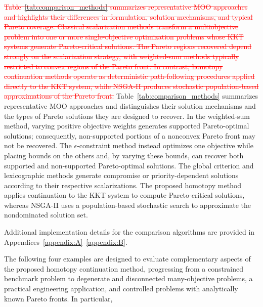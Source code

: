 \documentclass[11pt,pdflatex,sn-mathphys-ay]{sn-jnl}%
\theoremstyle{definition}
\theoremstyle{thmstyleone}%
\theoremstyle{thmstyletwo}%
\theoremstyle{thmstylethree}%
\newcommand{\del}[1]{\textcolor{red}{\sout{#1}}}
\newcommand{\add}[1]{\textcolor{revisionblue}{#1}}
\begin{document}
	\del{Table~\ref{tab:comparison_methods} summarizes representative MOO approaches and highlights their differences in formulation, solution mechanisms, and typical Pareto coverage. Classical scalarization methods transform a multiobjective problem into one or more single-objective optimization problems whose KKT systems generate Pareto-critical solutions. The Pareto regions recovered depend strongly on the scalarization strategy, with weighted-sum methods typically restricted to convex regions of the Pareto front. In contrast, homotopy continuation methods operate as deterministic path-following procedures applied directly to the KKT system, while NSGA-II produces stochastic population-based approximations of the Pareto front.}
	\add{Table~\ref{tab:comparison_methods} summarizes representative MOO
		approaches and distinguishes their solution mechanisms and the types of
		Pareto solutions they are designed to recover. In the weighted-sum
		method, varying positive objective weights generates supported
		Pareto-optimal solutions; consequently, non-supported portions of a
		nonconvex Pareto front may not be recovered. The
		$\epsilon$-constraint method instead optimizes one objective while
		placing bounds on the others and, by varying these bounds, can recover
		both supported and non-supported Pareto-optimal solutions. The global
		criterion and lexicographic methods generate compromise or
		priority-dependent solutions according to their respective
		scalarizations. The proposed homotopy method applies continuation to the KKT system to compute Pareto-critical solutions, whereas NSGA-II uses a population-based stochastic search to approximate the nondominated solution set. } 
	
	Additional implementation details for the comparison algorithms are
	provided in Appendices~\ref{appendix:A}--\ref{appendix:B}.
	
	\add{The following four examples are designed to evaluate complementary
		aspects of the proposed homotopy continuation method, progressing from
		a constrained benchmark problem to degenerate and disconnected
		many-objective problems, a practical engineering application, and
		controlled problems with analytically known Pareto fronts. In
		particular,}
	
\end{document}
